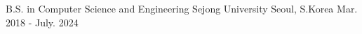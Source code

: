 

\begin{cventries}

  \cventry
    {B.S. in Computer Science and Engineering} %
    {Sejong University} %
    {Seoul, S.Korea} %
    {Mar. 2018 - July. 2024} %
    {
      \begin{cvitems} %
      \end{cvitems}
    }

\end{cventries}
